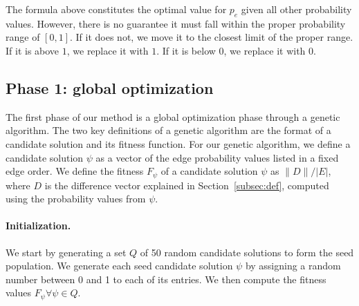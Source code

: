 \documentclass[runningheads,a4paper]{llncs}
\begin{document}
The formula above constitutes the optimal value for $p_e$ given all other
probability values. However, there is no guarantee it must fall within the
proper probability range of $[0, 1]$. If it does not, we move it to the closest
limit of the proper range. If it is above $1$, we replace it with $1$. If it
is below $0$, we replace it with $0$.

\subsection{Phase 1: global optimization}
\label{subsec:phase1}

The first phase of our method is a global optimization phase through a genetic
algorithm. The two key definitions of a genetic algorithm are the format of a
candidate solution and its fitness function. For our genetic algorithm, we
define a candidate solution $\psi$ as a vector of the edge probability values
listed in a fixed edge order. We define the fitness $F_{\psi}$ of a candidate
solution $\psi$ as $\|D\|/|E|$, where $D$ is the difference vector explained in
Section~\ref{subsec:def}, computed using the probability values from $\psi$.

\paragraph{\textbf{Initialization.}} We start by generating a set $Q$ of 50
random candidate solutions to form the seed population. We generate each seed candidate
solution $\psi$ by assigning a random number between 0 and 1 to each of its
entries. We then compute the fitness values $F_{\psi} \forall \psi \in Q$.
\end{document}
